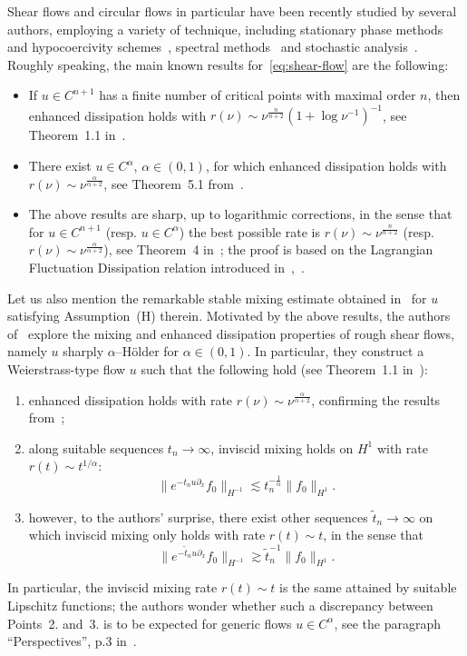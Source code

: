 \documentclass[11pt,oneside,reqno]{amsart}
\newenvironment{enumeratenumeric}{\begin{enumerate}[1.] }{\end{enumerate}}
\numberwithin{equation}{section}
\begin{document}
Shear flows and circular flows in particular have been recently studied by
several authors, employing a variety of technique, including stationary phase
methods and hypocoercivity
schemes~{\cite{bedrossian2017enhanced,zelati2020stable,zelati2020separation}},
spectral methods~{\cite{wei}} and stochastic analysis~{\cite{zelatidrivas}}.
Roughly speaking, the main known results for~\eqref{eq:shear-flow} are the
following:
\begin{itemize}
  \item If $u \in C^{n + 1}$ has a finite number of critical points with
  maximal order $n$, then enhanced dissipation holds with $r (\nu) \sim
  \nu^{\frac{n}{n + 2}} (1 + \log \nu^{- 1})^{- 1}$, see Theorem~1.1
  in~{\cite{bedrossian2017enhanced}}.
  
  \item There exist $u \in C^{\alpha}$, $\alpha \in (0, 1)$, for which
  enhanced dissipation holds with $r (\nu) \sim \nu^{\frac{\alpha}{\alpha +
  2}}$, see Theorem~5.1 from~{\cite{wei}}.
  
  \item The above results are sharp, up to logarithmic corrections, in the
  sense that for $u \in C^{n + 1}$ (resp. $u \in C^{\alpha}$) the best
  possible rate is $r (\nu) \sim \nu^{\frac{n}{n + 2}}$ (resp. $r (\nu) \sim
  \nu^{\frac{\alpha}{\alpha + 2}}$), see Theorem~4 in~{\cite{zelatidrivas}};
  the proof is based on the Lagrangian Fluctuation Dissipation relation
  introduced in~{\cite{drivas1}},~{\cite{drivas2}}.
\end{itemize}
Let us also mention the remarkable stable mixing estimate obtained
in~{\cite{zelati2020stable}} for $u$ satisfying Assumption~(H) therein.
Motivated by the above results, the authors of~{\cite{colombozelati}} explore
the mixing and enhanced dissipation properties of rough shear flows, namely
$u$ sharply $\alpha$--H\"{o}lder for $\alpha \in (0, 1)$. In particular, they
construct a Weierstrass-type flow $u$ such that the following hold (see
Theorem~1.1 in~{\cite{colombozelati}}):
\begin{enumeratenumeric}
  \item enhanced dissipation holds with rate $r (\nu) \sim
  \nu^{\frac{\alpha}{\alpha + 2}}$, confirming the results from~{\cite{wei}};
  
  \item along suitable sequences $t_n \rightarrow \infty$, inviscid mixing
  holds on $H^1$ with rate $r (t) \sim t^{1 / \alpha}$:
  \[ \| e^{- t_n u \partial_x} f_0 \|_{H^{- 1}} \lesssim t_n^{-
     \frac{1}{\alpha}}  \| f_0 \|_{H^1} . \]
  \item however, to the authors' surprise, there exist other sequences
  $\tilde{t}_n \rightarrow \infty$ on which inviscid mixing only holds with
  rate $r (t) \sim t$, in the sense that
  \[ \| e^{- \tilde{t}_n u \partial_x} f_0 \|_{H^{- 1}} \gtrsim
     \tilde{t}_n^{- 1}  \| f_0 \|_{H^1} . \]
\end{enumeratenumeric}
In particular, the inviscid mixing rate $r (t) \sim t$ is the same attained by
suitable Lipschitz functions; the authors wonder whether such a discrepancy
between Points~2. and~3. is to be expected for generic flows $u \in
C^{\alpha}$, see the paragraph ``Perspectives'', p.3
in~{\cite{colombozelati}}.
\end{document}
